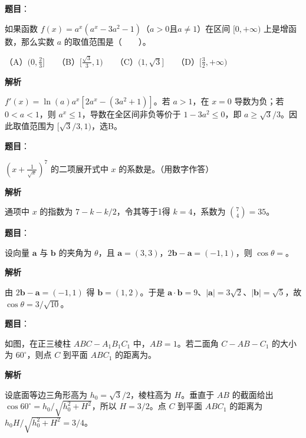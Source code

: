 \begin{answer}

\textbf{题目}：

如果函数 $f(x)=a^x(a^x-3a^2-1)$（$a>0$且$a\ne1$）在区间 $[0,+\infty)$ 上是增函数，那么实数 $a$ 的取值范围是\mbox{（　　）}。

（A）$(0,\frac23]$　　（B）$[\frac{\sqrt3}3,1)$　　（C）$(1,\sqrt3]$　　（D）$[\frac32,+\infty)$

\textbf{解析}

$f'(x)=\ln(a)a^x[2a^x-(3a^2+1)]$。若 $a>1$，在 $x=0$ 导数为负；若 $0<a<1$，则 $a^x\le1$，导数在全区间非负等价于 $1-3a^2\le0$，即 $a\ge\sqrt3/3$。因此取值范围为 $[\sqrt3/3,1)$，选B。


\end{answer}
\begin{answer}

\textbf{题目}：

$(x+\frac1{\sqrt{x}})^7$ 的二项展开式中 $x$ 的系数是\gkblank{}。（用数字作答）

\textbf{解析}

通项中 $x$ 的指数为 $7-k-k/2$，令其等于1得 $k=4$，系数为 $\binom74=35$。


\end{answer}
\begin{answer}

\textbf{题目}：

设向量 $\boldsymbol a$ 与 $\boldsymbol b$ 的夹角为 $\theta$，且 $\boldsymbol a=(3,3)$，$2\boldsymbol b-\boldsymbol a=(-1,1)$，则 $\cos\theta=$\gkblank{}。

\textbf{解析}

由 $2\boldsymbol b-\boldsymbol a=(-1,1)$ 得 $\boldsymbol b=(1,2)$。于是 $\boldsymbol a\cdot\boldsymbol b=9$、$|\boldsymbol a|=3\sqrt2$、$|\boldsymbol b|=\sqrt5$，故 $\cos\theta=3/\sqrt{10}$。


\end{answer}
\begin{answer}

\textbf{题目}：

如图，在正三棱柱 $ABC-A_1B_1C_1$ 中，$AB=1$。若二面角 $C-AB-C_1$ 的大小为 $60^\circ$，则点 $C$ 到平面 $ABC_1$ 的距离为\gkblank{}。
\nopagebreak[4]
\begin{center}\end{center}
\nopagebreak[4]
\textbf{解析}

设底面等边三角形高为 $h_0=\sqrt3/2$，棱柱高为 $H$。垂直于 $AB$ 的截面给出 $\cos60^\circ=h_0/\sqrt{h_0^2+H^2}$，所以 $H=3/2$。点 $C$ 到平面 $ABC_1$ 的距离为 $h_0H/\sqrt{h_0^2+H^2}=3/4$。


\end{answer}
